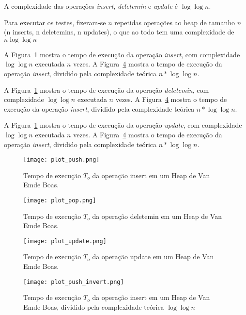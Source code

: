 \documentclass{article}
\begin{document}
A complexidade das operações \emph{insert}, \emph{deletemin} e \emph{update} é $ \log\log n $.

Para executar os testes, fizeram-se $ n $ repetidas operações ao heap de tamanho $ n $ (n inserts, n deletemins, n updates), o que ao todo tem uma complexidade de $ n \log\log n $

A Figura~\ref{fig3} mostra o tempo de execução da operação \emph{insert}, com complexidade $\log\log n$ executada $n$ vezes. A Figura~\ref{fig6} mostra o tempo de execução da operação \emph{insert}, dividido pela complexidade teórica $n * \log\log n$.

A Figura~\ref{fig3} mostra o tempo de execução da operação \emph{deletemin}, com complexidade $\log\log n$ executada $n$ vezes. A Figura~\ref{fig6} mostra o tempo de execução da operação \emph{insert}, dividido pela complexidade teórica $n * \log\log n$.

A Figura~\ref{fig3} mostra o tempo de execução da operação \emph{update}, com complexidade $\log\log n$ executada $n$ vezes. A Figura~\ref{fig6} mostra o tempo de execução da operação \emph{insert}, dividido pela complexidade teórica $n * \log\log n$.

\begin{figure}
  \centering
  \texttt{[image: plot\_push.png]}
  \caption{Tempo de execução $T_o$ da operação insert em um Heap de Van Emde Boas.}
  \label{fig3}
\end{figure}

\begin{figure}
  \centering
  \texttt{[image: plot\_pop.png]}
  \caption{Tempo de execução $T_o$ da operação deletemin em um Heap de Van Emde Boas.}
  \label{fig4}
\end{figure}

\begin{figure}
  \centering
  \texttt{[image: plot\_update.png]}
  \caption{Tempo de execução $T_o$ da operação update em um Heap de Van Emde Boas.}
  \label{fig5}
\end{figure}

\begin{figure}
  \centering
  \texttt{[image: plot\_push\_invert.png]}
  \caption{Tempo de execução $T_o$ da operação insert em um Heap de Van Emde Boas, dividido pela complexidade teórica $\log\log n$}
  \label{fig6}
\end{figure}
\end{document}

